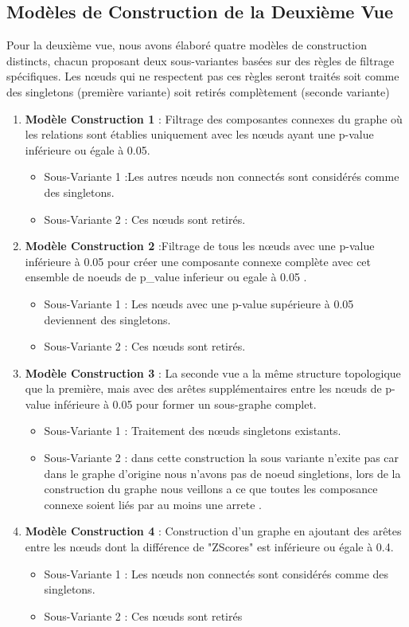 \subsection{Modèles de Construction de la Deuxième Vue}
Pour la deuxième vue, nous avons élaboré quatre modèles de construction distincts, chacun proposant deux sous-variantes basées sur des règles de filtrage spécifiques. Les nœuds qui ne respectent pas ces règles seront traités soit comme des singletons (première variante) soit retirés complètement (seconde variante)
    \begin{enumerate}
        \item  \textbf{Modèle Construction 1} : Filtrage des composantes connexes du graphe où les relations sont établies uniquement avec les nœuds ayant une p-value inférieure ou égale à 0.05.
            \begin{itemize}
                \item  Sous-Variante 1 :Les autres nœuds non connectés sont considérés comme des singletons.
                \item Sous-Variante 2 : Ces nœuds sont retirés.
            \end{itemize}
        \item \textbf{Modèle Construction 2 }:Filtrage de tous les nœuds avec une p-value inférieure à 0.05 pour créer une composante connexe complète avec cet ensemble de noeuds de p\_value inferieur ou egale à 0.05 .
            \begin{itemize}
              \item Sous-Variante 1 : Les nœuds avec une p-value supérieure à 0.05 deviennent des singletons.
               \item Sous-Variante 2 : Ces nœuds sont retirés.
            \end{itemize}
        \item \textbf{Modèle Construction 3}  : La seconde vue a la même structure topologique que la première, mais avec des arêtes supplémentaires entre les nœuds de p-value inférieure à 0.05 pour former un sous-graphe complet.
            \begin{itemize}
                \item Sous-Variante 1 : Traitement des nœuds singletons existants.
                \item Sous-Variante 2 : dans cette construction la sous variante n'exite pas car dans le graphe d'origine nous n'avons pas de noeud singletions, lors de la construction du graphe nous veillons a ce que toutes les composance connexe soient liés par au moins une arrete .
            \end{itemize}
      \item \textbf{Modèle Construction 4 }: Construction d'un graphe en ajoutant des arêtes entre les nœuds dont la différence de "ZScores" est inférieure ou égale à 0.4.
        \begin{itemize}
            \item Sous-Variante 1 : Les nœuds non connectés sont considérés comme des singletons.
          \item  Sous-Variante 2 : Ces nœuds sont retirés 
        \end{itemize}
     

\end{enumerate}

